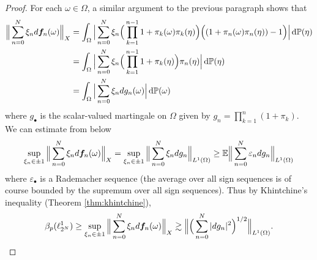 \begin{proof}
  For each $\omega \in \Omega$, a similar argument to the previous paragraph shows that
  \begin{equation*}
    \begin{aligned}
      \Big\|  \sum_{n=0}^{N} \xi_{n} d\bm{f}_{n}(\omega) \Big\|_{X} 
      &= \int_{\Omega} \Big| \sum_{n=0}^{N} \xi_{n} \Big(\prod_{k=1}^{n-1} 1 + \pi_k(\omega) \pi_k (\eta) \Big) \Big((1 + \pi_n(\omega) \pi_n(\eta)) - 1\Big) \Big|\, \mathrm{d}\mathbb{P}(\eta) \\
      &= \int_{\Omega} \Big| \sum_{n=0}^{N} \xi_{n} \Big(\prod_{k=1}^{n-1} 1 + \pi_k (\eta) \Big) \pi_n(\eta) \Big|\, \mathrm{d}\mathbb{P}(\eta) \\
      &= \int_{\Omega} \Big| \sum_{n=0}^{N} \xi_{n} dg_{n}(\omega) \Big| \, \mathrm{d}\mathbb{P}(\omega)
    \end{aligned}
  \end{equation*}
  where $g_{\bullet}$ is the scalar-valued martingale on $\Omega$ given by $g_{n} = \prod_{k=1}^{n} (1 + \pi_{k})$.
  We can estimate from below
  \begin{equation*}
      \sup_{\xi_{n} \in \pm 1} \Big\|  \sum_{n=0}^{N} \xi_{n} d\bm{f}_{n}(\omega) \Big\|_{X}
      = \sup_{\xi_n \in \pm 1} \Big\|  \sum_{n=0}^{N} \xi_{n} dg_{n} \Big\|_{L^1(\Omega)} 
      \geq \mathbb{E} \Big\| \sum_{n=0}^{N} \varepsilon_{n} dg_{n} \Big\|_{L^1(\Omega)}
  \end{equation*}
  where $\varepsilon_{\bullet}$ is a Rademacher sequence (the average over all sign sequences is of course bounded by the supremum over all sign sequences).
  Thus by Khintchine's inequality (Theorem \ref{thm:khintchine}),
  \begin{equation*}
    \beta_{p}(\ell^{1}_{2^N}) \geq \sup_{\xi_{n} \in \pm 1} \Big\|  \sum_{n=0}^{N} \xi_{n} d\bm{f}_{n}(\omega) \Big\|_{X}
    \gtrsim \Big\| \Big( \sum_{n=0}^{N} |dg_{n}|^2 \Big)^{1/2} \Big\|_{L^1(\Omega)}.
  \end{equation*}


\end{proof}
